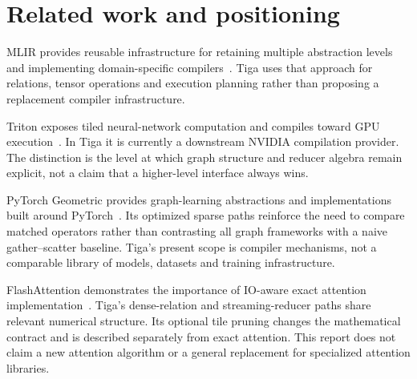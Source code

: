 \section{Related work and positioning}
MLIR provides reusable infrastructure for retaining multiple abstraction levels
and implementing domain-specific compilers~\cite{mlir}. Tiga uses that approach
for relations, tensor operations and execution planning rather than proposing a
replacement compiler infrastructure.

Triton exposes tiled neural-network computation and compiles toward GPU
execution~\cite{triton}. In Tiga it is currently a downstream NVIDIA compilation
provider. The distinction is the level at which graph structure and reducer
algebra remain explicit, not a claim that a higher-level interface always wins.

PyTorch Geometric provides graph-learning abstractions and implementations built
around PyTorch~\cite{pyg}. Its optimized sparse paths reinforce the need to compare
matched operators rather than contrasting all graph frameworks with a naive
gather--scatter baseline. Tiga's present scope is compiler mechanisms, not a
comparable library of models, datasets and training infrastructure.

FlashAttention demonstrates the importance of IO-aware exact attention
implementation~\cite{flashattention}. Tiga's dense-relation and streaming-reducer
paths share relevant numerical structure. Its optional tile pruning changes the
mathematical contract and is described separately from exact attention. This
report does not claim a new attention algorithm or a general replacement for
specialized attention libraries.
